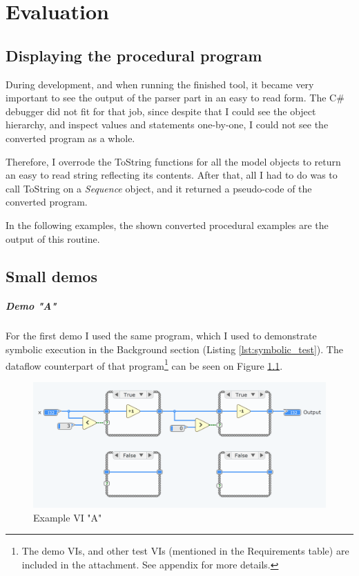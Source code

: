 \chapter{Evaluation}
\section{Displaying the procedural program}
During development, and when running the finished tool, it became very important to see the output of the parser part in an easy to read form. The C\# debugger did not fit for that job, since despite that I could see the object hierarchy, and inspect values and statements one-by-one, I could not see the converted program as a whole. 

Therefore, I overrode the ToString functions for all the model objects to return an easy to read string reflecting its contents. After that, all I had to do was to call ToString on a \textit{Sequence} object, and it returned a pseudo-code of the converted program.

In the following examples, the shown converted procedural examples are the output of this routine.
\section{Small demos}
\paragraph{Demo "A"}
For the first demo I used the same program, which I used to demonstrate symbolic execution in the Background section (Listing \ref{lst:symbolic_test}). The dataflow counterpart of that program\footnote{The demo VIs, and other test VIs (mentioned in the Requirements table) are included in the attachment. See appendix for more details.} can be seen on Figure \ref{fig:testvi1}.
\begin{figure}
\centering
\includegraphics[width=150mm,keepaspectratio]{figures/testvi1.png}
\caption{Example VI "A"} 
\label{fig:testvi1}
\end{figure}

